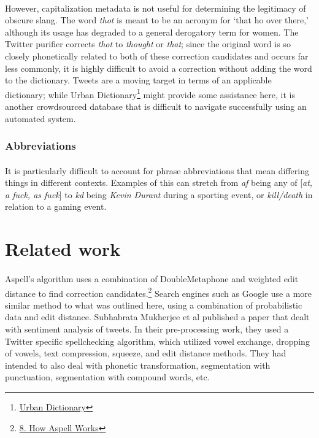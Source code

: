 \documentclass[twocolumn,10pt]{article}
\begin{document}
\paragraph{} However, capitalization metadata is not useful for determining the legitimacy of obscure slang. The word \textit{thot} is meant to be an acronym for `that ho over there,' although its usage has degraded to a general derogatory term for women. The Twitter purifier corrects \textit{thot} to \textit{thought} or \textit{that}; since the original word is so closely phonetically related to both of these correction candidates and occurs far less commonly, it is highly difficult to avoid a correction without adding the word to the dictionary. Tweets are a moving target in terms of an applicable dictionary; while Urban Dictionary\footnote{\href{http://www.urbandictionary.com/}{Urban Dictionary}} might provide some assistance here, it is another crowdsourced database that is difficult to navigate successfully using an automated system.
\subsubsection*{Abbreviations}
\paragraph{}It is particularly difficult to account for phrase abbreviations that mean differing things in different contexts. Examples of this can stretch from \textit{af} being any of [\textit{at, a fuck, as fuck}] to \textit{kd} being \textit{Kevin Durant} during a sporting event, or \textit{kill/death} in relation to a gaming event.

\section*{Related work}
\paragraph{} Aspell's algorithm uses a combination of DoubleMetaphone and weighted edit distance to find correction candidates.\footnote{\href{http://aspell.net/0.50-doc/man-html/8_How.html}{8. How Aspell Works}} Search engines such as Google use a more similar method to what was outlined here, using a combination of probabilistic data and edit distance.
Subhabrata Mukherjee et al published a paper that dealt with sentiment analysis of tweets. In their pre-processing work, they used a Twitter specific spellchecking algorithm, which utilized vowel exchange, dropping of vowels, text compression, squeeze, and edit distance methods. They had intended to also deal with phonetic transformation, segmentation with punctuation, segmentation with compound words, etc.
\end{document}

